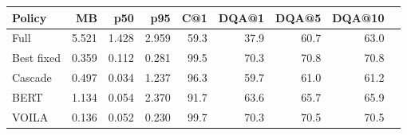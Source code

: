 \begin{tabular}{lrrrrrrrr}
\toprule
Policy & MB & p50 & p95 & C@1 & DQA@1 & DQA@5 & DQA@10 \\
\midrule
Full & 5.521 & 1.428 & 2.959 & 59.3 & 37.9 & 60.7 & 63.0 \\
Best fixed & 0.359 & 0.112 & 0.281 & 99.5 & 70.3 & 70.8 & 70.8 \\
Cascade & 0.497 & 0.034 & 1.237 & 96.3 & 59.7 & 61.0 & 61.2 \\
BERT & 1.134 & 0.054 & 2.370 & 91.7 & 63.6 & 65.7 & 65.9 \\
VOILA & 0.136 & 0.052 & 0.230 & 99.7 & 70.3 & 70.5 & 70.5 \\
\bottomrule
\end{tabular}
